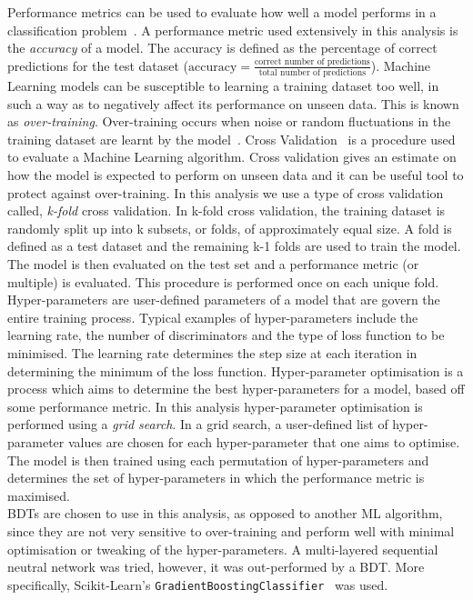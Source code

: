 Performance metrics can be used to evaluate how well a model performs in a classification problem~\cite{ML-metrics}. A performance metric used extensively in this analysis is the \textit{accuracy} of a model. The accuracy is defined as the percentage of correct predictions for the test dataset ($\text{accuracy} = \frac{\text{correct number of predictions}}{\text{total number of predictions}}$). Machine Learning models can be susceptible to learning a training dataset too well, in such a way as to negatively affect its performance on unseen data. This is known as \textit{over-training}. Over-training occurs when noise or random fluctuations in the training dataset are learnt by the model~\cite{overfitting-blog}. Cross Validation~\cite{cv-blog} is a procedure used to evaluate a Machine Learning algorithm. Cross validation gives an estimate on how the model is expected to perform on unseen data and it can be useful tool to protect against over-training. In this analysis we use a type of cross validation called, \textit{k-fold} cross validation. In k-fold cross validation, the training dataset is randomly split up into k subsets, or folds, of approximately equal size. A fold is defined as a test dataset and the remaining k-1 folds are used to train the model. The model is then evaluated on the test set and a performance metric (or multiple) is evaluated. This procedure is performed once on each unique fold. Hyper-parameters are user-defined parameters of a model that are govern the entire training process. Typical examples of hyper-parameters include the learning rate, the number of discriminators and the type of loss function to be minimised. The learning rate determines the step size at each iteration in determining the minimum of the loss function. Hyper-parameter optimisation is a process which aims to determine the best hyper-parameters for a model, based off some performance metric. In this analysis hyper-parameter optimisation is performed using a \textit{grid search}. In a grid search, a user-defined list of hyper-parameter values are chosen for each hyper-parameter that one aims to optimise. The model is then trained using each permutation of hyper-parameters and determines the set of hyper-parameters in which the performance metric is maximised.\\

BDTs are chosen to use in this analysis, as opposed to another ML algorithm, since they are not very sensitive to over-training and perform well with minimal optimisation or tweaking of the hyper-parameters. A multi-layered sequential neutral network was tried, however, it was out-performed by a BDT. More specifically, Scikit-Learn's \texttt{GradientBoostingClassifier}~\cite{scikit-bdt} was used.

